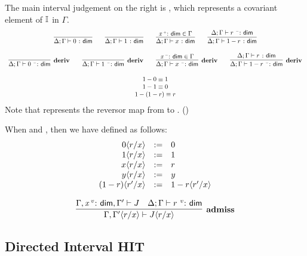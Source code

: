 \documentclass[11pt]{article}
\theoremstyle{plain}
\begin{document}
The main interval judgement on the right is , which
represents a covariant element of $\mathbb{I}$ in $\Gamma$.
\[
\begin{array}{c}
\infer{\wfdimc{\Delta}{\Gamma}{0}}{} 
\qquad
\infer{\wfdimc{\Delta}{\Gamma}{1}}{} 
\qquad
\infer{\wfdimc{\Delta}{\Gamma}{x}}{\vdimtm{x}{\co} \in \Gamma} 
\qquad
\infer{\wfdimc{\Delta}{\Gamma}{\rev{r}}}
      {\vwfdimc{\Delta}{\Gamma}{r}{\con}}
\\ \\
\infer[\deriv]{\vwfdimc{\Delta}{\Gamma}{0}{\con}}{} 
\qquad
\infer[\deriv]{\vwfdimc{\Delta}{\Gamma}{1}{\con}}{} 
\qquad
\infer[\deriv]{\vwfdimc{\Delta}{\Gamma}{x}{\con}}{\vdimtm{x}{\con} \in \Gamma} 
\qquad
\infer[\deriv]{\vwfdimc{\Delta}{\Gamma}{\rev{r}}{\con}}{\wfdimc{\Delta}{\Gamma}{r}}
\\ \\
\rev{0} \deq 1 \\
\rev{1} \deq 0 \\
\rev{(\rev{r})} \deq r \\
\end{array}
\]
Note that  represents the reversor map from \op{\II} to \II.
()

When  and
, then we have
 defined as
follows:
\[
\begin{array}{rcl}
0 \langle r / x \rangle & := & 0 \\ 
1 \langle r / x \rangle & := & 1 \\
x \langle r / x \rangle & := & r \\
y \langle r / x \rangle & := & y \\
(1-r) \langle r' / x \rangle & := & 1-r \langle r' / x \rangle \\ 
\end{array}
\]

\[
\infer[\textbf{admiss}]
      {\Gamma,\nsubst{\Gamma'}{r}{x} \vdash \nsubst{J}{r}{x}}
      {\Gamma,\vdimtm{x}{v},\Gamma' \vdash {J} &
        \vwfdimc{\Delta}{\Gamma}{r}{v}}
\]

\subsection{Directed Interval HIT}
\end{document}
